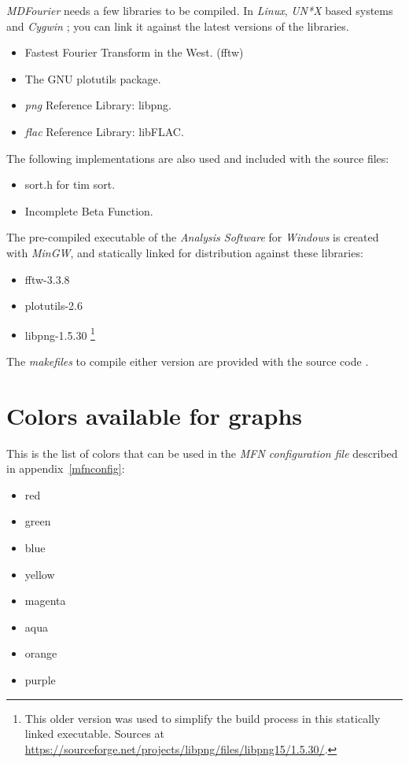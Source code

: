 \documentclass[10pt,a4paper]{report}
\newcommand{\ac}[1]{\textit{\mbox{\acrshort{#1}}}}
\begin{document}
\begin{appendices}
\textit{MDFourier} needs a few libraries to be compiled. In \textit{Linux}, \textit{UN*X} based systems and \textit{Cygwin} \cite{cygwin}; you can link it against the latest versions of the libraries. 

\begin{itemize}
	\item Fastest Fourier Transform in the West. (fftw) \cite{fftw}
	\item The GNU plotutils package. \cite{libplot}
	\item \ac{png} Reference Library: libpng. \cite{libpng}
	\item \ac{flac} Reference Library: libFLAC. \cite{libflac}
\end{itemize}

The following implementations are also used and included with the source files:

\begin{itemize}
	\item sort.h for tim sort. \cite{sort}
	\item Incomplete Beta Function. \cite{betafunction}
\end{itemize}

The pre-compiled executable of the \textit{Analysis Software} for \textit{Windows} is created with \textit{MinGW}\cite{mingw}, and statically linked for distribution against these libraries:

\begin{itemize}
	\item fftw-3.3.8 \cite{fftw}
	\item plotutils-2.6 \cite{libplot}
	\item libpng-1.5.30 \footnote{This older version was used to simplify the build process in this statically linked executable. Sources at \url{https://sourceforge.net/projects/libpng/files/libpng15/1.5.30/}.}
\end{itemize}

The \textit{makefiles} to compile either version are provided with the source code \cite{sourcecode}.

\chapter{Colors available for graphs}
\label{availablecolors}

This is the list of colors that can be used in the \textit{MFN configuration file} described in appendix~\ref{mfnconfig}: 

\begin{itemize}
	\item red
	\item green
	\item blue
	\item yellow
	\item magenta
	\item aqua
	\item orange
	\item purple
\end{itemize}


\end{appendices}
\end{document}
